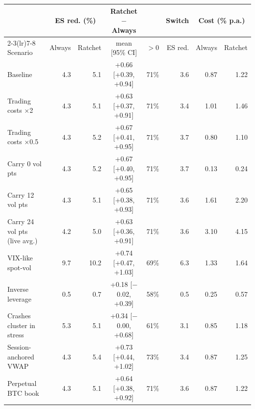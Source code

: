 \begin{tabular}{@{}lrrcrrrr@{}}
\toprule
 & \multicolumn{2}{c}{ES red. (\%)} & Ratchet $-$ Always & & Switch & \multicolumn{2}{c}{Cost (\% p.a.)} \\
\cmidrule(lr){2-3}\cmidrule(lr){7-8}
Scenario & Always & Ratchet & mean [95\% CI] & $>0$ & ES red. & Always & Ratchet \\
\midrule
Baseline & 4.3 & 5.1 & +0.66 [+0.39, +0.94] & 71\% & 3.6 & 0.87 & 1.22 \\
Trading costs $\times$2 & 4.3 & 5.1 & +0.63 [+0.37, +0.91] & 71\% & 3.4 & 1.01 & 1.46 \\
Trading costs $\times$0.5 & 4.3 & 5.2 & +0.67 [+0.41, +0.95] & 71\% & 3.7 & 0.80 & 1.10 \\
Carry 0 vol pts & 4.3 & 5.2 & +0.67 [+0.40, +0.95] & 71\% & 3.7 & 0.13 & 0.24 \\
Carry 12 vol pts & 4.3 & 5.1 & +0.65 [+0.38, +0.93] & 71\% & 3.6 & 1.61 & 2.20 \\
Carry 24 vol pts (live avg.) & 4.2 & 5.0 & +0.63 [+0.36, +0.91] & 71\% & 3.6 & 3.10 & 4.15 \\
VIX-like spot-vol & 9.7 & 10.2 & +0.74 [+0.47, +1.03] & 69\% & 6.3 & 1.33 & 1.64 \\
Inverse leverage & 0.5 & 0.7 & +0.18 [\ensuremath{-}0.02, +0.39] & 58\% & 0.5 & 0.25 & 0.57 \\
Crashes cluster in stress & 5.3 & 5.1 & +0.34 [\ensuremath{-}0.00, +0.68] & 61\% & 3.1 & 0.85 & 1.18 \\
Session-anchored VWAP & 4.3 & 5.4 & +0.73 [+0.44, +1.02] & 73\% & 3.4 & 0.87 & 1.25 \\
Perpetual BTC book & 4.3 & 5.1 & +0.64 [+0.38, +0.92] & 71\% & 3.6 & 0.87 & 1.22 \\
\bottomrule
\end{tabular}
